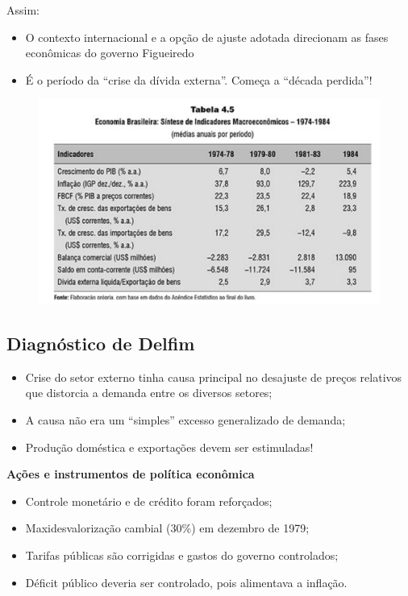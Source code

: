 \documentclass[a4paper,12pt]{article}[abntex2]
\begin{document}
Assim:\begin{itemize}
    \item O contexto internacional e a opção de ajuste adotada direcionam as fases econômicas do governo Figueiredo
    \item É o período da ``crise da dívida externa''. Começa a ``década perdida''!
\end{itemize}

\begin{figure}[H]
    \centering
    \includegraphics[width=0.7\linewidth]{Imagens/a8i2.png}
\end{figure}

\subsection{\textbf{Diagnóstico de Delfim}}

\begin{itemize}
    \item Crise do setor externo tinha causa principal no desajuste de preços relativos que distorcia a demanda entre os diversos setores;
    \item A causa não era um ``simples'' excesso generalizado de demanda;
    \item Produção doméstica e exportações devem ser estimuladas!
\end{itemize}

\textbf{Ações e instrumentos de política econômica}\begin{itemize}
    \item Controle monetário e de crédito foram reforçados;
    \item Maxidesvalorização cambial (30\%) em dezembro de 1979;
    \item Tarifas públicas são corrigidas e gastos do governo controlados;
    \item Déficit público deveria ser controlado, pois alimentava a inflação.
\end{itemize}
\end{document}
